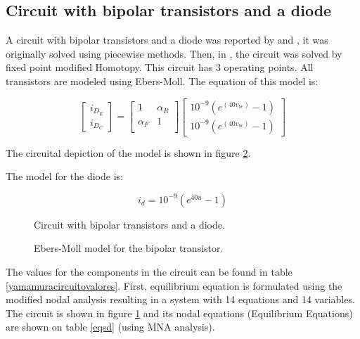 \documentclass[journal,twocolumn]{IEEEtran}
\begin{document}
\subsection{Circuit with bipolar transistors and a diode}

A circuit with bipolar transistors and a diode was reported by \cite{homo_tadeusiewicz} and  \cite{homo_yamamurawise}, it was originally solved using piecewise methods. Then, in \cite{homo_yamamura}, the circuit was solved by fixed point modified Homotopy. This circuit has 3 operating points. All transistors are modeled using Ebers-Moll. The equation of this model is:

\begin{displaymath}
\left[ \begin{array}{c}
i_{D_E} \\
i_{D_C}
\end{array}\right] =
\left[ \begin{array}{cc} 1  & \alpha_R \\
\alpha_F & 1 \\
\end{array}\right] \left[ \begin{array}{c}
10^{-9}(e^{(40v_{be})} - 1) \\
10^{-9}(e^{(40v_{bc})} - 1)
\end{array}\right]
\end{displaymath}

The circuital depiction of the model is shown in figure \ref{FEbersMoll}.

The model for the diode is:

\begin{displaymath}
i_d=10^{-9}(e^{40u} - 1)
\end{displaymath}

\begin{figure}[tbp]
\centerline{
\epsfxsize=90mm
}
\caption{Circuit with bipolar transistors and a diode.}
\label{yamamuracircuito}
\end{figure}

\begin{figure}[hbtp]
\centerline{
\epsfxsize=2mm
}
\caption{Ebers-Moll model for the bipolar transistor.}
\label{FEbersMoll}
\end{figure}

The values for the components in the circuit can be found in table \ref{yamamuracircuitovalores}. First, equilibrium equation is formulated using the modified nodal analysis resulting in a system with 14 equations and 14 variables. The circuit is shown in figure \ref{yamamuracircuito} and its nodal equations  (Equilibrium Equations) are shown on table \ref{eqsd} (using MNA analysis).
\end{document}
